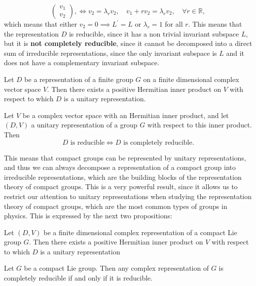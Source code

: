 \begin{example}
\[\begin{pmatrix}
            v_1 \\
            v_2
        \end{pmatrix}, \iff v_2 = \lambda_r v_2, \quad v_1 + r v_2 = \lambda_r v_2, \quad \forall r \in \mathbb{R},
    \]
    which means that either \(v_2 = 0 \implies L^{\prime} =L\) or \(\lambda_r = 1\) for all \(r\). This means that the representation \(D\) is reducible, since it has a non trivial invariant subspace \(L\), but it is \textbf{not completely reducible}, since it cannot be decomposed into a direct sum of irreducible representations, since the only invariant subspace is \(L\) and it does not have a complementary invariant subspace.
\end{example}

\begin{proposition}
    Let \(D\) be a representation of a finite group \(G\) on a finite dimensional complex vector space \(V\). Then there exists a positive Hermitian inner product on \(V\) with respect to which \(D\) is a unitary representation.
\end{proposition}

\begin{theorem}
    Let \(V\) be a complex vector space with an Hermitian inner product, and let \((D,V)\) a unitary representation of a group \(G\) with respect to this inner product. Then
    \[
        D \text{ is reducible} \iff D \text{ is completely reducible}.
    \]
\end{theorem}

This means that compact groups can be represented by unitary representations, and thus we can always decompose a representation of a compact group into irreducible representations, which are the building blocks of the representation theory of compact groups. This is a very powerful result, since it allows us to restrict our attention to unitary representations when studying the representation theory of compact groups, which are the most common types of groups in physics. This is expressed by the next two propositions:
\begin{proposition}
    Let \((D,V)\) be a finite dimensional complex representation of a compact Lie group \(G\). Then there exists a positive Hermitian inner product on \(V\) with respect to which \(D\) is a unitary representation
\end{proposition}
\begin{proposition}
    Let \(G\) be a compact Lie group. Then any complex representation of \(G\) is completely reducible if and only if it is reducible.
\end{proposition}

